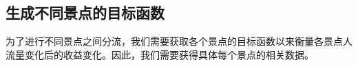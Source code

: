\documentclass[12pt]{article}  %
\begin{document}
\subsection{生成不同景点的目标函数}
为了进行不同景点之间分流，我们需要获取各个景点的目标函数以来衡量各景点人流量变化后的收益变化。因此，我们需要获得具体每个景点的相关数据。




\end{document}
